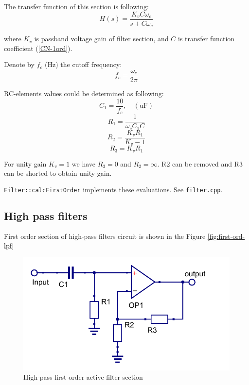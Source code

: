 The transfer function of this section is following:
\begin{equation}
 H(s)=\frac{K_{v}C\omega_c}{s+C\omega_c}
\end{equation}

where $K_{v}$ is passband voltage gain of filter section, and $C$ is transfer
function coefficient (\ref{CN-1ord}). 

Denote by $f_c$ (Hz) the cutoff frequency:
\begin{equation}
 f_c = \frac{\omega_c}{2\pi}
\end{equation}

RC-elements values could be determined as following:
\begin{equation}
 C_1 = \frac{10}{f_c}, \quad (\mbox{uF})
\end{equation}
\begin{equation}
 R_1=\frac{1}{\omega_cC_1C}
\end{equation}
\begin{equation}
 R_2=\frac{K_vR_1}{K_v-1} \label{R2-1ord}
\end{equation}
\begin{equation}
 R_3=K_vR_1 \label{R3-1ord}
\end{equation}

For unity gain $K_v=1$ we have $R_3=0$ and $R_2=\infty$. R2 can be removed and
R3 can be shorted to obtain unity gain. 

\verb|Filter::calcFirstOrder| implements these evaluations. See
\verb|filter.cpp|.

\subsection{High pass filters}

First order section of high-pass filters circuit is shown in the Figure
\ref{fig:first-ord-lpf}

\begin{figure}[!ht]
  \centering
  \includegraphics[width=0.5\linewidth]{pics/first-ord-hpf}
  \caption{High-pass first order active filter section}
  \label{fig:first-ord-hpf}
\end{figure}

